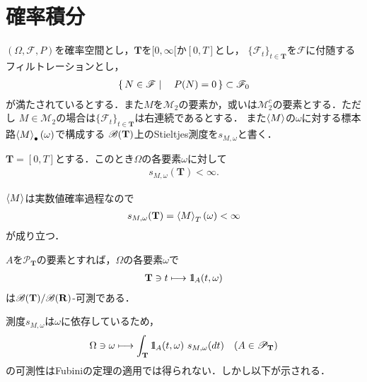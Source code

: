 \section{確率積分}
	$(\Omega,\mathscr{F},P)$を確率空間とし，$\mathbf{T}$を$[0,\infty[$か$[0,T]$とし，
	$\{\mathscr{F}_t\}_{t \in \mathbf{T}}$を$\mathscr{F}$に付随するフィルトレーションとし，
	\begin{align}
		\left\{\, N \in \mathscr{F} \mid \quad P(N) = 0\, \right\} \subset \mathscr{F}_0
	\end{align}
	が満たされているとする．また$M$を$\mathscr{M}_2$の要素か，或いは$\mathscr{M}_2^c$の要素とする．ただし
	$M \in \mathscr{M}_2$の場合は$\{\mathscr{F}_t\}_{t \in \mathbf{T}}$は右連続であるとする．
	また$\inprod<M>$の$\omega$に対する標本路$\inprod<M>_\bullet(\omega)$で構成する
	$\mathscr{B}(\mathbf{T})$上のStieltjes測度を$s_{M,\omega}$と書く．
	
	\begin{screen}
		\begin{thm}
			$\mathbf{T} = [0,T]$とする．このとき$\Omega$の各要素$\omega$に対して
			\begin{align}
				s_{M,\omega}(\mathbf{T}) < \infty.
			\end{align}
		\end{thm}
	\end{screen}
	
	\begin{prf}
		$\inprod<M>$は実数値確率過程なので
		\begin{align}
			s_{M,\omega}(\mathbf{T}) = \inprod<M>_T(\omega) < \infty
		\end{align}
		が成り立つ．
		\QED
	\end{prf}
	
	\begin{screen}
		\begin{thm}
			$A$を$\mathscr{P}_{\mathbf{T}}$の要素とすれば，$\Omega$の各要素$\omega$で
			\begin{align}
				\mathbf{T} \ni t \longmapsto \mbox{1}\hspace{-0.25em}\mbox{l}_A(t,\omega)
			\end{align}
			は$\mathscr{B}(\mathbf{T})/\mathscr{B}(\mathbf{R})$-可測である．
		\end{thm}
	\end{screen}
	
	測度$s_{M,\omega}$は$\omega$に依存しているため，
	\begin{align}
		\Omega \ni \omega \longmapsto \int_{\mathbf{T}} \mbox{1}\hspace{-0.25em}\mbox{l}_A(t,\omega)\ s_{M,\omega}(dt)
		\quad (A \in \mathscr{P}_{\mathbf{T}})
	\end{align}
	の可測性はFubiniの定理の適用では得られない．しかし以下が示される．
	
